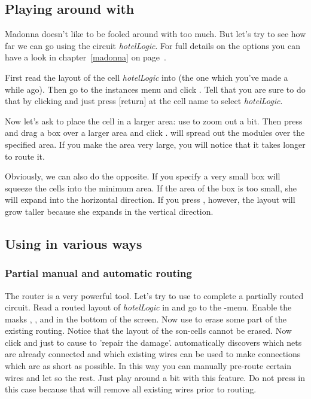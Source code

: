 \subsection{Playing around with \protect{}}
Madonna doesn't like to be fooled around with too much. But let's try to see
how far we can go using the circuit {\sl hotelLogic}. For full details on the
options you can have a look in chapter~\ref{madonna} on page~\pageref{madonna}.

First read the layout of the cell {\sl hotelLogic} into  (the one
which you've made a while ago). Then go to the instances menu and click
. Tell  that you are sure to do that by 
clicking  and just press [return] at the cell name to 
select {\sl hotelLogic}.

Now let's ask  to place the cell in a larger area: use
 to zoom out a bit. 
Then press  and
drag a box over a larger area and click .
 will spread out the modules over the specified area. If you make
the area very large, you will notice that it takes  longer to route
it.

Obviously, we can also do the opposite. If you specify a very small box
 will squeeze the cells into the minimum area. If the area of the box
is too small, she will expand into the horizontal direction. If you press
, however, the layout will grow taller because she expands in
the vertical direction.

\subsection{Using \protect{} in various ways}
\subsubsection{Partial manual and automatic routing}

The router  is a very powerful tool.  Let's try to use
 to complete a partially routed circuit.  Read a routed layout
of {\sl hotelLogic} in and go to the -menu. Enable the masks
, ,  and  in the bottom of the
screen. Now use  to erase some part of the existing routing.
Notice that the layout of the son-cells cannot be erased. Now
click and just  to cause 
to 'repair the damage'.  automatically discovers which nets are
already connected and which existing wires can be used to make connections
which are as short as possible. In this way you can manually pre-route
certain wires and let  so the rest. Just play around a bit with
this feature.  Do not press  in this case because that
will remove all existing wires prior to routing.

